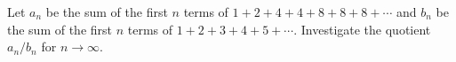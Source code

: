 Let $a_n$ be the sum of the first $n$ terms of $1 + 2 + 4 + 4 + 8 + 8 + 8 + \cdots$ and $b_n$ be the sum of the first $n$ terms of $1 + 2 + 3 + 4 + 5 + \cdots$. Investigate the quotient $a_n/b_n$ for $n \to \infty$.
